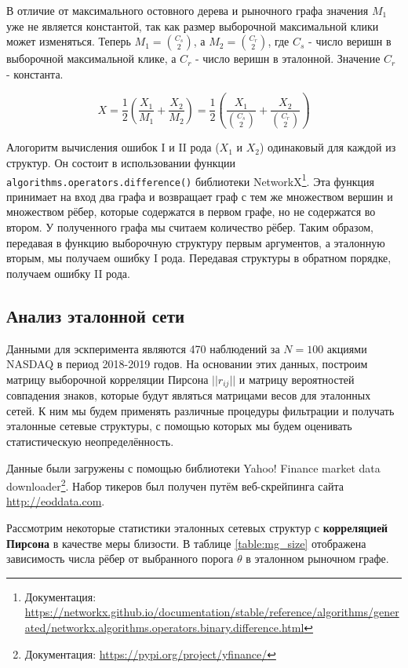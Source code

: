 В отличие от максимального остовного дерева и рыночного графа значения $M_1$ уже не является константой, так как размер выборочной максимальной клики может изменяться. Теперь $M_1 = \binom{C_s}{2}$, а $M_2 = \binom{C_r}{2}$, где $C_s$ - число веришн в выборочной максимальной клике, а $C_r$ - число веришн в эталонной. Значение $C_r$ - константа.

\begin{equation}
X = \frac{1}{2}\left(\frac{X_1}{M_1} + \frac{X_2}{M_2}\right) = \frac{1}{2}\left(\frac{X_1}{\binom{C_s}{2}} + \frac{X_2}{\binom{C_r}{2}}\right)
\end{equation}


Алогоритм вычисления ошибок I и II рода ($X_1$ и $X_2$) одинаковый для каждой из структур. Он состоит в использовании функции  \verb|algorithms.operators.difference()| библиотеки NetworkX\footnote{Документация: \url{https://networkx.github.io/documentation/stable/reference/algorithms/generated/networkx.algorithms.operators.binary.difference.html}}. Эта функция принимает на вход два графа и возвращает граф с тем же множеством вершин  и множеством рёбер, которые содержатся в первом графе, но не содержатся во втором. У полученного графа мы считаем количество рёбер. Таким образом, передавая в функцию выборочную структуру первым аргументов, а эталонную вторым, мы получаем ошибку I рода. Передавая структуры в обратном порядке, получаем ошибку II рода.


\subsection{Анализ эталонной сети}

Данными для эскперимента являются 470 наблюдений за $N=100$ акциями NASDAQ в период 2018-2019 годов. На основании этих данных, построим матрицу выборочной корреляции Пирсона $||r_{i j}||$ и матрицу вероятностей совпадения знаков, которые будут являться матрицами весов для эталонных сетей. К ним мы будем применять различные процедуры фильтрации и получать эталонные сетевые структуры, с помощью которых мы будем оценивать статистическую неопределённость.

Данные были загружены с помощью библиотеки Yahoo! Finance market data downloader\footnote{Документация: \url{https://pypi.org/project/yfinance/}}. Набор тикеров был получен путём веб-скрейпинга сайта \url{http://eoddata.com}.

Рассмотрим некоторые статистики эталонных сетевых структур с\textbf{ корреляцией Пирсона} в качестве меры близости. В таблице \ref{table:mg_size} отображена зависимость числа рёбер от выбранного порога $\theta$ в эталонном рыночном графе.

